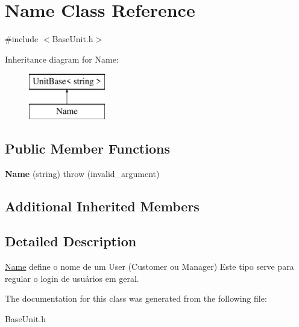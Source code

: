 \hypertarget{className}{\section{Name Class Reference}
\label{className}
}


{\ttfamily \#include $<$Base\-Unit.\-h$>$}

Inheritance diagram for Name\-:\begin{figure}[H]
\begin{center}
\leavevmode
\includegraphics[height=2.000000cm]{className}
\end{center}
\end{figure}
\subsection*{Public Member Functions}
\begin{DoxyCompactItemize}
\item 
\hypertarget{className_a8dd10bd69cabf897c06439b32c9070f7}{{\bfseries Name} (string)  throw (invalid\-\_\-argument)}\label{className_a8dd10bd69cabf897c06439b32c9070f7}

\end{DoxyCompactItemize}
\subsection*{Additional Inherited Members}


\subsection{Detailed Description}
\hyperlink{className}{Name} define o nome de um User (Customer ou Manager) Este tipo serve para regular o login de usuários em geral. 

The documentation for this class was generated from the following file\-:\begin{DoxyCompactItemize}
\item 
Base\-Unit.\-h\end{DoxyCompactItemize}
